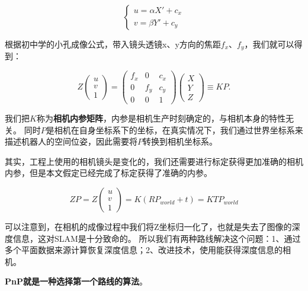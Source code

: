 \begin{equation}
\begin{cases}
    u = \alpha X' + c_x \\
    v = \beta Y' + c_y 
 \end{cases}
\end{equation}

根据初中学的小孔成像公式，带入镜头透镜x、y方向的焦距$f_x$、$f_y$，我们就可以得到：

\begin{equation}
    Z
    \begin{pmatrix}
        u \\ v \\ 1
    \end{pmatrix}
    =
    \begin{pmatrix}
        f_x & 0 & c_x \\
        0 & f_y & c_y \\
        0 & 0 & 1
    \end{pmatrix}
    \begin{pmatrix}
        X \\ Y \\ Z
    \end{pmatrix}
    \equiv K  P.
\end{equation}

我们把$K$称为\textbf{相机内参矩阵}，内参是相机生产时刻确定的，与相机本身的特性无关。
同时$P$是相机在自身坐标系下的坐标，在真实情况下，我们通过世界坐标系来描述机器人的空间位姿，因此需要将$P$转换到相机坐标系。

其实，工程上使用的相机镜头是变化的，我们还需要进行标定获得更加准确的相机内参，但是本文假定已经完成了标定获得了准确的内参。

\begin{equation}
    Z P = Z 
    \begin{pmatrix}
        u\\v\\1
    \end{pmatrix}
    = K ( R P_{world} + t) = K T P_{world}
    \label{eq:rt}
\end{equation}

可以注意到，在相机的成像过程中我们将Z坐标归一化了，也就是失去了图像的深度信息，这对SLAM是十分致命的。
所以我们有两种路线解决这个问题：1、通过多个平面数据来源计算恢复深度信息；2、改进技术，使用能获得深度信息的相机。

\textbf{PnP就是一种选择第一个路线的算法}。


